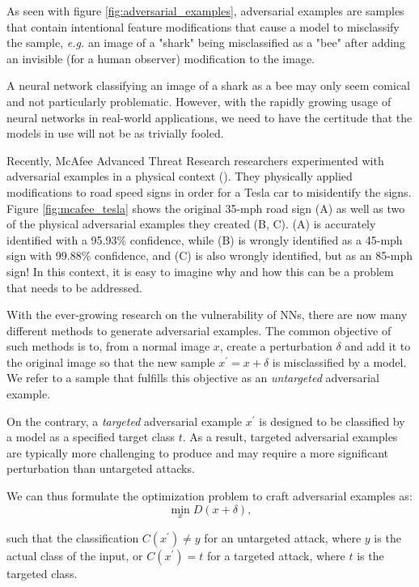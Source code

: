 As seen with figure \ref{fig:adversarial_examples}, adversarial examples are
samples that contain intentional feature modifications that cause a model to
misclassify the sample, \emph{e.g.} an image of a "shark" being misclassified as
a "bee" after adding an invisible (for a human observer) modification to the
image.

A neural network classifying an image of a shark as a bee may only seem comical
and not particularly problematic. However, with the rapidly growing usage of
neural networks in real-world applications, we need to have the certitude that
the models in use will not be as trivially fooled.

Recently, McAfee Advanced Threat Research researchers experimented with
adversarial examples in a physical context (\cite{noauthor_model_2020}). They
physically applied modifications to road speed signs in order for a Tesla car to
misidentify the signs. Figure \ref{fig:mcafee_tesla} shows the original 35-mph
road sign (A) as well as two of the physical adversarial examples they created
(B, C). (A) is accurately identified with a 95.93\% confidence, while (B) is
wrongly identified as a 45-mph sign with 99.88\% confidence, and (C) is also
wrongly identified, but as an 85-mph sign! In this context, it is easy to
imagine why and how this can be a problem that needs to be addressed.


With the ever-growing research on the vulnerability of NNs, there are now many
different methods to generate adversarial examples. The common objective of such
methods is to, from a normal image $x$, create a perturbation $\delta$ and add
it to the original image so that the new sample $x^{\prime}=x+\delta$ is
misclassified by a model. We refer to a sample that fulfills this objective as
an \textit{untargeted} adversarial example.

On the contrary, a \textit{targeted} adversarial example $x^{\prime}$ is
designed to be classified by a model as a specified target class $t$. As a
result, targeted adversarial examples are typically more challenging to produce
and may require a more significant perturbation than untargeted attacks.

We can thus formulate the optimization problem to craft adversarial examples as:
\begin{equation} \label{eq:adversarial_example_min}
    \min_{x}D(x+\delta),
\end{equation}


such that the classification $C(x^\prime)\neq{y}$ for an untargeted attack,
where $y$ is the actual class of the input, or $C(x^\prime)={t}$ for a targeted
attack, where $t$ is the targeted class.

